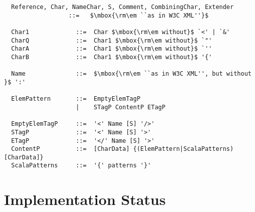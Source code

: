 \begin{lstlisting}
  Reference, Char, NameChar, S, Comment, CombiningChar, Extender      
                  ::=   $\mbox{\rm\em ``as in W3C XML''}$

  Char1             ::=  Char $\mbox{\rm\em without}$ `<' | `&'
  CharQ             ::=  Char1 $\mbox{\rm\em without}$ `"'
  CharA             ::=  Char1 $\mbox{\rm\em without}$ `''
  CharB             ::=  Char1 $\mbox{\rm\em without}$ '{'

  Name              ::=  $\mbox{\rm\em ``as in W3C XML'', but without }$ ':'

  ElemPattern       ::=  EmptyElemTagP
                    |    STagP ContentP ETagP                                       

  EmptyElemTagP     ::=  '<' Name [S] '/>'
  STagP             ::=  '<' Name [S] '>'                          
  ETagP             ::=  '</' Name [S] '>'                                        
  ContentP          ::=  [CharData] {(ElemPattern|ScalaPatterns) [CharData]}
  ScalaPatterns     ::=  '{' patterns '}'

\end{lstlisting}

\chapter{Implementation Status}





